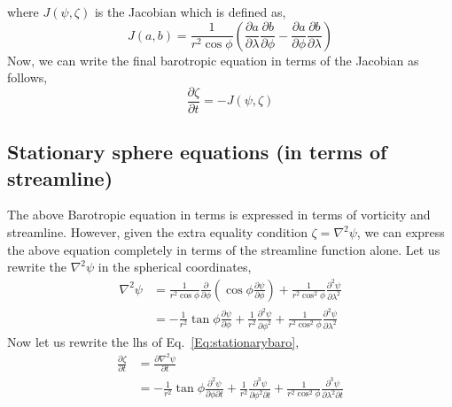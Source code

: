 \documentclass[aps,pra,a4paper,twocolumn,longbibliography,groupedaddress]{revtex4-2}
\begin{document}
where $J(\psi, \zeta)$ is the Jacobian which is defined as,
\begin{equation}
    J(a, b) = \frac{1}{r^2 \cos\phi}\left(\frac{\partial a}{\partial \lambda}\frac{\partial b}{\partial \phi} - \frac{\partial a}{\partial \phi}\frac{\partial b}{\partial \lambda} \right)
\end{equation}
Now, we can write the final barotropic equation in terms of the Jacobian as follows,
\begin{equation}
    \frac{\partial \zeta}{\partial t} = -J(\psi, \zeta)
    \label{Eq:stationarybaro}
\end{equation}

\subsection{Stationary sphere equations (in terms of streamline)}

The above Barotropic equation in terms is expressed in terms of vorticity and streamline. However, given the extra equality condition $\zeta = \nabla^2 \psi$, we can express the above equation completely in terms of the streamline function alone. Let us rewrite the $\nabla^2 \psi$ in the spherical coordinates,
\begin{equation}
\begin{split}
    \nabla^2 \psi &= \frac{1}{r^2 \cos\phi} \frac{\partial}{\partial \phi}\left(\cos\phi \frac{\partial \psi}{\partial \phi}\right) + \frac{1}{r^2\cos^2\phi}\frac{\partial^2 \psi}{\partial \lambda^2} \\
    &= -\frac{1}{r^2}\tan\phi\frac{\partial \psi}{\partial \phi} + \frac{1}{r^2}\frac{\partial^2 \psi}{\partial \phi^2} + \frac{1}{r^2\cos^2\phi}\frac{\partial^2 \psi}{\partial \lambda^2} 
\end{split}
\end{equation}
Now let us rewrite the \gls{lhs} of Eq.~\eqref{Eq:stationarybaro},
\begin{equation}
\begin{split}
     \frac{\partial \zeta}{\partial t} &= \frac{\partial \nabla^2 \psi}{\partial t} \\
     &= -\frac{1}{r^2}\tan\phi\frac{\partial^2 \psi}{\partial \phi \partial t} + \frac{1}{r^2}\frac{\partial^3 \psi}{\partial \phi^2 \partial t} + \frac{1}{r^2\cos^2\phi}\frac{\partial^3 \psi}{\partial \lambda^2 \partial t}
\end{split}
\end{equation}
\end{document}
